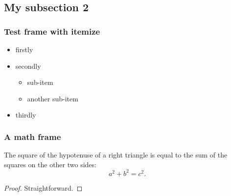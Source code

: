 \documentclass[pdflatex,compress]{beamer}
\begin{document}
\subsection{My subsection 2}
\begin{frame}
\frametitle{Test frame with itemize}

\begin{itemize}
    \item<1-> firstly
    \item<2-> secondly
        \begin{itemize}
            \item sub-item
            \item another sub-item
        \end{itemize}
      \item<3-> thirdly
\end{itemize}

\end{frame}


\begin{frame}
\frametitle{A math frame}

\begin{theorem}[Pythagoras]
The square of the hypotenuse of a \alert{right} triangle is equal to the sum of the squares on the other two sides:
\[
a^2 + b^2 = c^2.
\]
\end{theorem}

\begin{proof}
Straightforward.
\end{proof}

\end{frame}
\end{document}
